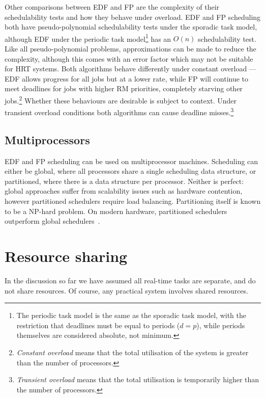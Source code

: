 Other comparisons between \gls{EDF} and \gls{FP} are the complexity of their schedulability tests and how
they behave under overload.
\gls{EDF} and \gls{FP} scheduling both have pseudo-polynomial schedulability tests under the sporadic task model, although \gls{EDF} under the periodic task model\footnote{The periodic task model is the same as the sporadic task model, with the restriction that deadlines must be equal to periods ($d = p$), while periods themselves are considered absolute, not minimum.} has an $O(n)$ schedulability test.
Like all pseudo-polynomial problems, approximations can be made to reduce the complexity, although this comes with an error factor which may not be suitable for \gls{HRT} systems.
Both algorithms behave differently under constant overload --- \gls{EDF} allows progress for all jobs but at a lower rate, while \gls{FP} will continue to meet deadlines for jobs with higher \gls{RM} priorities, completely starving other jobs.\footnote{\emph{Constant overload} means that the total utilisation of the system is greater than the number of processors.}
Whether these behaviours are desirable is subject to context.
Under transient overload conditions both algorithms can cause deadline misses.\footnote{\emph{Transient overload} means that the total utilisation is temporarily higher than the number of processors.}

\subsection{Multiprocessors}

\gls{EDF} and \gls{FP} scheduling can be used on multiprocessor machines.
Scheduling can either be global, where all processors share a single scheduling data structure, or partitioned, where there is a data structure per processor.
 Neither is perfect: global approaches suffer from scalability issues such as hardware contention, however partitioned schedulers require load balancing.
Partitioning itself is known to be a NP-hard problem.
On modern hardware, partitioned schedulers outperform global schedulers~\citep{Brandenburg:phd}.

\section{Resource sharing}
\label{sec:resource-sharing-theory}

In the discussion so far we have assumed all real-time tasks are separate, and do not share resources.
Of course, any practical system involves shared resources.

